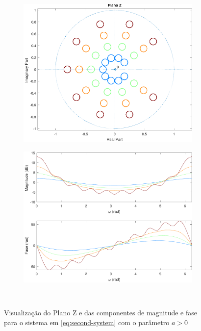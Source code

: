 \documentclass[a4paper,11pt]{article}
\numberwithin{figure}{section}
\numberwithin{equation}{section}
\numberwithin{table}{section}
\theoremstyle{definition}
\begin{document}
\begin{figure}[ht]
\begin{subfigure}{0.44\textwidth}
		\includegraphics[width=\textwidth]{ex_2_pz_10}
	\end{subfigure}
	\begin{subfigure}{0.44\textwidth}
		\includegraphics[width=\textwidth]{ex_2_bode_10}
	\end{subfigure}\\
		
	\caption{Visualizaç\~ao do Plano Z e das componentes de magnitude e fase para o sistema em \eqref{eq:second-system} com o par\^ametro $a > 0$}
	\label{fig:02}
\end{figure}
\end{document}
